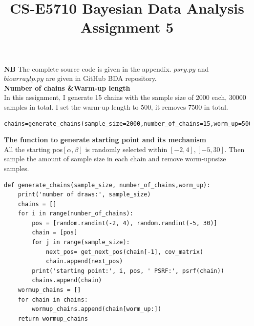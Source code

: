 \documentclass{article}
\begin{document}
\title{CS-E5710 Bayesian Data Analysis\\Assignment 5}                  
\maketitle



\textbf{NB} The complete source code is given in the appendix. $psry.py$ and $bioarraylp.py$ are given in GitHub BDA repository. \\

\textbf{Number of chains \&Warm-up length}\\

In this assignment, I generate 15 chains with the sample size of 2000 each, 30000 samples in total. I set the warm-up length to 500, it removes 7500 in total.

\begin{verbatim} 
chains=generate_chains(sample_size=2000,number_of_chains=15,worm_up=500)
\end{verbatim}

\textbf{The function to generate starting point and its mechanism}\\

All the starting pos$[\alpha, \beta]$ is randomly selected within $[-2,4], [-5,30]$. Then sample the amount of sample size in each chain and remove worm-upnsize samples.
\begin{verbatim} 
def generate_chains(sample_size, number_of_chains,worm_up):
    print('number of draws:', sample_size)
    chains = []
    for i in range(number_of_chains):
        pos = [random.randint(-2, 4), random.randint(-5, 30)]
        chain = [pos]
        for j in range(sample_size):
            next_pos= get_next_pos(chain[-1], cov_matrix)
            chain.append(next_pos)
        print('starting point:', i, pos, ' PSRF:', psrf(chain))
        chains.append(chain)
    wormup_chains = []
    for chain in chains:
        wormup_chains.append(chain[worm_up:])
    return wormup_chains
\end{verbatim}
\end{document}
